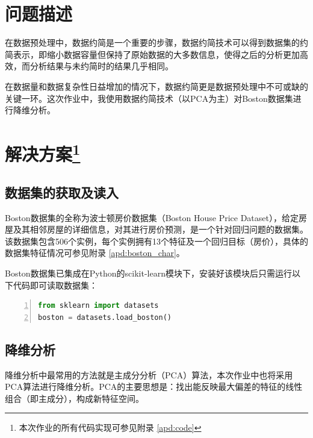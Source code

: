 \documentclass[12pt,a4paper]{article}
\theoremstyle{definition}
\begin{document}
\noindent
\noindent{}

\section{问题描述}

在数据预处理中，数据约简是一个重要的步骤，数据约简技术可以得到数据集的约简表示，即缩小数据容量但保持了原始数据的大多数信息，使得之后的分析更加高效，而分析结果与未约简时的结果几乎相同。

在数据量和数据复杂性日益增加的情况下，数据约简更是数据预处理中不可或缺的关键一环。这次作业中，我使用数据约简技术（以PCA为主）对Boston数据集进行降维分析。

\section{解决方案\protect\footnote{本次作业的所有代码实现可参见附录 \ref{apd:code}}}

\subsection{数据集的获取及读入}

Boston数据集的全称为波士顿房价数据集（Boston House Price Dataset），给定房屋及其相邻房屋的详细信息，对其进行房价预测，是一个针对回归问题的数据集。该数据集包含506个实例，每个实例拥有13个特征及一个回归目标（房价），具体的数据集特征情况可参见附录 \ref{apd:boston_char}。

Boston数据集已集成在Python的scikit-learn模块下，安装好该模块后只需运行以下代码即可读取数据集：

\vspace{0.01\linewidth}

\begin{lstlisting}[language=Python,
numbers=left,
keywordstyle=\color{blue!70},
frame=shadowbox,
breaklines=True]
from sklearn import datasets
boston = datasets.load_boston()
\end{lstlisting}

\subsection{降维分析}

降维分析中最常用的方法就是主成分分析（PCA）算法，本次作业中也将采用PCA算法进行降维分析。PCA的主要思想是：找出能反映最大偏差的特征的线性组合（即主成分），构成新特征空间。
\end{document}
